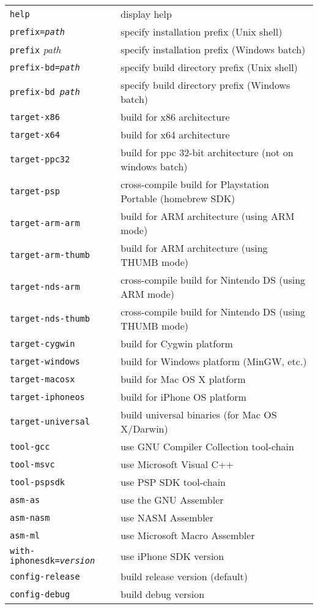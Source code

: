 \begin{enumerate}
\begin{tabular}{ll}	
{\tt help}                 & display help \\
{\tt prefix={\it path}}    & specify installation prefix (Unix shell) \\
{\tt prefix} {\it path}    & specify installation prefix (Windows batch) \\
{\tt prefix-bd={\it path}} & specify build directory prefix (Unix shell) \\
{\tt prefix-bd {\it path}} & specify build directory prefix (Windows batch) \\
{\tt target-x86}           & build for x86 architecture \\
{\tt target-x64}           & build for x64 architecture \\
{\tt target-ppc32}         & build for ppc 32-bit architecture (not on windows batch)\\
{\tt target-psp}           & cross-compile build for Playstation Portable (homebrew SDK)\\
{\tt target-arm-arm}       & build for ARM architecture (using ARM mode) \\
{\tt target-arm-thumb}     & build for ARM architecture (using THUMB mode) \\
{\tt target-nds-arm}       & cross-compile build for Nintendo DS (using ARM mode) \\
{\tt target-nds-thumb}     & cross-compile build for Nintendo DS (using THUMB mode) \\
{\tt target-cygwin}        & build for Cygwin platform \\
{\tt target-windows}       & build for Windows platform (MinGW, etc.) \\
{\tt target-macosx}        & build for Mac OS X platform \\
{\tt target-iphoneos}      & build for iPhone OS platform \\
{\tt target-universal}     & build universal binaries (for Mac OS X/Darwin) \\
{\tt tool-gcc}             & use GNU Compiler Collection tool-chain \\
{\tt tool-msvc}            & use Microsoft Visual C++ \\
{\tt tool-pspsdk}          & use PSP SDK tool-chain \\
{\tt asm-as}               & use the GNU Assembler \\
{\tt asm-nasm}             & use NASM Assembler \\
{\tt asm-ml}               & use Microsoft Macro Assembler \\
{\tt with-iphonesdk={\it version}} & use iPhone SDK version \\
{\tt config-release}       & build release version (default) \\
{\tt config-debug}         & build debug version \\
\end{tabular}


\end{enumerate}
